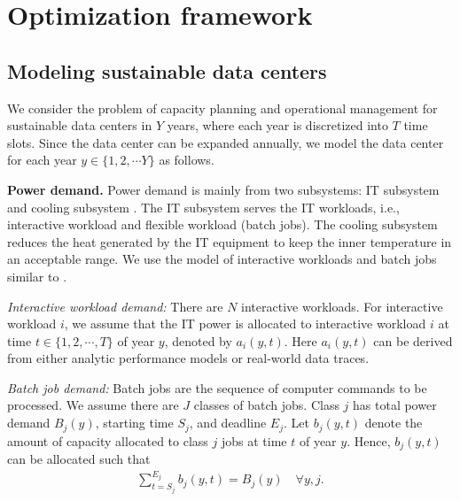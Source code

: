 \section{Optimization framework}
\label{sec:OptimizationFramework}


\subsection{Modeling sustainable data centers}

We consider the problem of capacity planning and operational management for sustainable data centers in $Y$ years, where each year is discretized into $T$ time slots. Since the data center can be expanded annually, we model the data center for each year $y \in \{1,2, \cdots Y \}$ as follows.

\textbf{Power demand.} Power demand is mainly from two subsystems: IT subsystem and cooling subsystem \cite{barroso2013datacenter}. The IT subsystem serves the IT workloads, i.e., interactive workload and flexible workload (batch jobs). The cooling subsystem reduces the heat generated by the IT equipment to keep the inner temperature in an acceptable range. We use the model of interactive workloads and batch jobs similar to \cite{liu2012renewable}.
    
\emph{Interactive workload demand:} There are $N$ interactive workloads. For interactive workload $i$, we assume that the IT power is allocated to interactive workload $i$ at time $t \in \{ 1, 2, \cdots, T \}$ of year $y$, denoted by $a_{i}(y,t)$. Here $a_{i}(y,t)$ can be derived from either analytic performance models  \cite{urgaonkar2005analytical} or real-world data traces.
    
\emph{Batch job demand:} Batch jobs are the sequence of computer commands to be processed. We assume there are $J$ classes of batch jobs. Class $j$ has total power demand $B_{j}(y)$, starting time $S_{j}$, and deadline $E_{j}$. Let $b_{j}(y,t)$ denote the amount of capacity allocated to class $j$ jobs at time $t$ of year $y$. Hence, $b_{j}(y,t)$ can be allocated such that
\begin{align}
\label{const:batchJobs}
\textstyle \sum_{t=S_j}^{E_j}b_{j}(y,t)= B_{j}(y) \quad \forall y,j.
\end{align}

